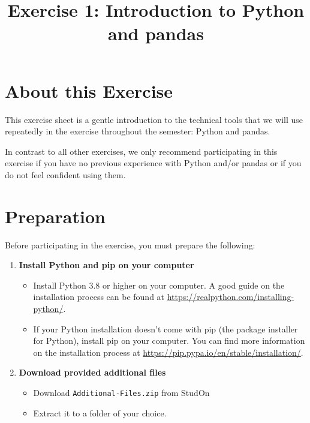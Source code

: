 \documentclass[
english,
smallborders
]{i6prcsht}
\begin{document}
\title{Exercise 1: Introduction to Python and pandas}
\maketitle

\section*{About this Exercise}

This exercise sheet is a gentle introduction to the technical tools that we will use repeatedly in the exercise throughout the semester: Python and pandas.

In contrast to all other exercises, we only recommend participating in this exercise if you have no previous experience with Python and/or pandas or if you do not feel confident using them.

\section*{Preparation}

Before participating in the exercise, you must prepare the following:

\begin{enumerate}
	\item \textbf{Install Python and pip on your computer}

	      \begin{itemize}
		      \item Install Python 3.8 or higher on your computer.
		            A good guide on the installation process can be found at \url{https://realpython.com/installing-python/}.
		      \item If your Python installation doesn't come with pip (the package installer for Python), install pip on your computer.
		            You can find more information on the installation process at \url{https://pip.pypa.io/en/stable/installation/}.
	      \end{itemize}

	\item \textbf{Download provided additional files}

	      \begin{itemize}
		      \item Download \texttt{Additional-Files.zip} from StudOn
		      \item Extract it to a folder of your choice.
	      \end{itemize}

\end{enumerate}
\end{document}
